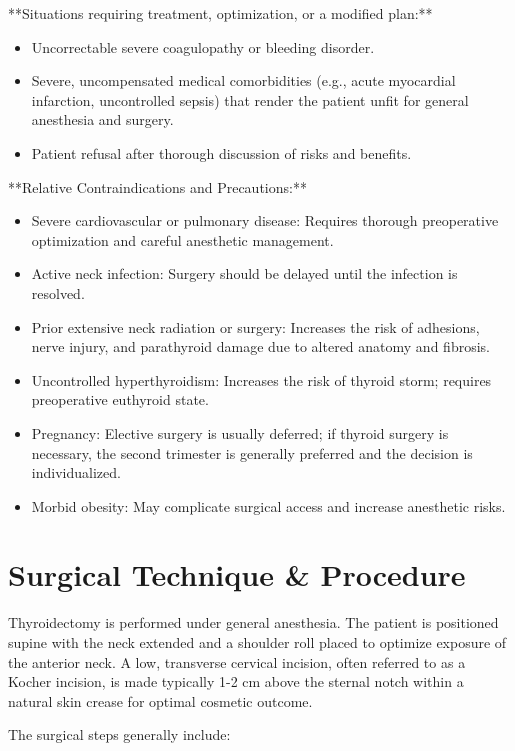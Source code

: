 **Situations requiring treatment, optimization, or a modified plan:**

\begin{itemize}
  \item Uncorrectable severe coagulopathy or bleeding disorder.
  \item Severe, uncompensated medical comorbidities (e.g., acute myocardial infarction, uncontrolled sepsis) that render the patient unfit for general anesthesia and surgery.
  \item Patient refusal after thorough discussion of risks and benefits.
\end{itemize}

**Relative Contraindications and Precautions:**

\begin{itemize}
  \item Severe cardiovascular or pulmonary disease: Requires thorough preoperative optimization and careful anesthetic management.
  \item Active neck infection: Surgery should be delayed until the infection is resolved.
  \item Prior extensive neck radiation or surgery: Increases the risk of adhesions, nerve injury, and parathyroid damage due to altered anatomy and fibrosis.
  \item Uncontrolled hyperthyroidism: Increases the risk of thyroid storm; requires preoperative euthyroid state.
  \item Pregnancy: Elective surgery is usually deferred; if thyroid surgery is necessary, the second trimester is generally preferred and the decision is individualized.
  \item Morbid obesity: May complicate surgical access and increase anesthetic risks.
\end{itemize}

\section*{Surgical Technique \& Procedure}
Thyroidectomy is performed under general anesthesia. The patient is positioned supine with the neck extended and a shoulder roll placed to optimize exposure of the anterior neck. A low, transverse cervical incision, often referred to as a Kocher incision, is made typically 1-2 cm above the sternal notch within a natural skin crease for optimal cosmetic outcome.

The surgical steps generally include:

